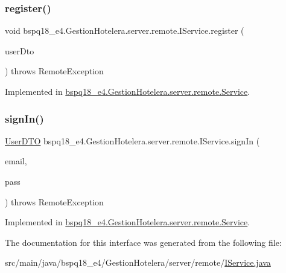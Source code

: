 \subsubsection{\texorpdfstring{register()}{register()}}
{\footnotesize\ttfamily void bspq18\+\_\+e4.\+Gestion\+Hotelera.\+server.\+remote.\+I\+Service.\+register (\begin{DoxyParamCaption}\item[{\mbox{\hyperlink{classbspq18__e4_1_1_gestion_hotelera_1_1server_1_1dto_1_1_user_d_t_o}{User\+D\+TO}}}]{user\+Dto }\end{DoxyParamCaption}) throws Remote\+Exception}



Implemented in \mbox{\hyperlink{classbspq18__e4_1_1_gestion_hotelera_1_1server_1_1remote_1_1_service_adcb6c2c890c84852528743a2ed77818a}{bspq18\+\_\+e4.\+Gestion\+Hotelera.\+server.\+remote.\+Service}}.

\mbox{\label{interfacebspq18__e4_1_1_gestion_hotelera_1_1server_1_1remote_1_1_i_service_a8bf5c73858016c112f2c93792f61eec5}} 
\subsubsection{\texorpdfstring{sign\+In()}{signIn()}}
{\footnotesize\ttfamily \mbox{\hyperlink{classbspq18__e4_1_1_gestion_hotelera_1_1server_1_1dto_1_1_user_d_t_o}{User\+D\+TO}} bspq18\+\_\+e4.\+Gestion\+Hotelera.\+server.\+remote.\+I\+Service.\+sign\+In (\begin{DoxyParamCaption}\item[{String}]{email,  }\item[{String}]{pass }\end{DoxyParamCaption}) throws Remote\+Exception}



Implemented in \mbox{\hyperlink{classbspq18__e4_1_1_gestion_hotelera_1_1server_1_1remote_1_1_service_ada202b6aa741a41984d4da00c169b22e}{bspq18\+\_\+e4.\+Gestion\+Hotelera.\+server.\+remote.\+Service}}.



The documentation for this interface was generated from the following file\+:\begin{DoxyCompactItemize}
\item 
src/main/java/bspq18\+\_\+e4/\+Gestion\+Hotelera/server/remote/\mbox{\hyperlink{_i_service_8java}{I\+Service.\+java}}\end{DoxyCompactItemize}
